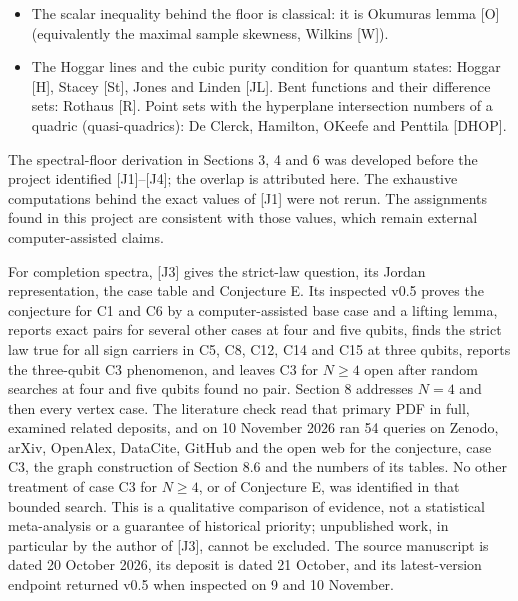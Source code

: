 \documentclass[11pt,a4paper]{article}
\begin{document}
\begin{itemize}
  {[}CGK{]}. \(\mathbb{Z}_4\)-valued quadratic forms and their character sums: {[}CCKS{]}. Two-character sets,
  two-weight codes and strongly regular graphs: Calderbank and Kantor {[}CK{]}. The bent functions of
  Maiorana and McFarland: {[}McF{]}.
\item
  The scalar inequality behind the floor is classical: it is Okumura\textquotesingle s lemma {[}O{]} (equivalently the
  maximal sample skewness, Wilkins {[}W{]}).
\item
  The Hoggar lines and the cubic purity condition for quantum states: Hoggar {[}H{]}, Stacey {[}St{]},
  Jones and Linden {[}JL{]}. Bent functions and their difference sets: Rothaus {[}R{]}. Point sets with the
  hyperplane intersection numbers of a quadric (quasi-quadrics): De Clerck, Hamilton, O\textquotesingle Keefe and
  Penttila {[}DHOP{]}.
\end{itemize}

The spectral-floor derivation in Sections 3, 4 and 6 was developed before the project identified
{[}J1{]}--{[}J4{]}; the overlap is attributed here. The exhaustive computations behind the exact values of {[}J1{]}
were not rerun. The assignments found in this project are consistent with those values, which remain
external computer-assisted claims.

For completion spectra, {[}J3{]} gives the strict-law question, its Jordan representation, the case table
and Conjecture E. Its inspected v0.5 proves the conjecture for C1 and C6 by a computer-assisted base
case and a lifting lemma, reports exact pairs for several other cases at four and five qubits, finds
the strict law true for all sign carriers in C5, C8, C12, C14 and C15 at three qubits, reports the
three-qubit C3 phenomenon, and leaves C3 for \(N\ge4\) open after random searches at four and five
qubits found no pair. Section 8 addresses \(N=4\) and then every vertex case. The literature check
read that primary PDF in full, examined related deposits, and on 10 November 2026 ran 54 queries on
Zenodo, arXiv, OpenAlex, DataCite, GitHub and the open web for the conjecture, case C3, the graph
construction of Section 8.6 and the numbers of its tables. No other treatment of case C3 for \(N\ge4\),
or of Conjecture E, was identified in that bounded search. This is a qualitative comparison of evidence,
not a statistical meta-analysis or a guarantee of historical priority; unpublished work, in
particular by the author of {[}J3{]}, cannot be excluded. The source manuscript is dated 20 October 2026,
its deposit is dated 21 October, and its latest-version endpoint returned v0.5 when inspected on 9
and 10 November.
\end{document}
